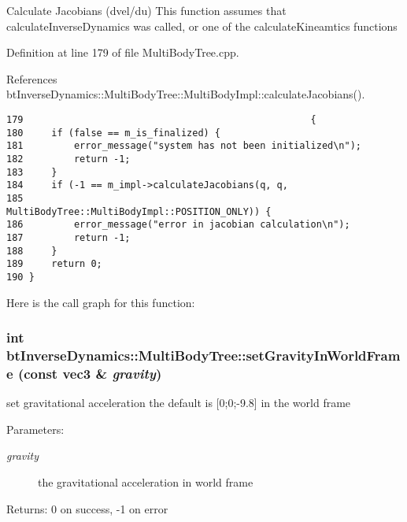 Calculate Jacobians (dvel/du) This function assumes that calculateInverseDynamics was called, or one of the calculateKineamtics functions 

Definition at line 179 of file MultiBodyTree.cpp.

References btInverseDynamics::MultiBodyTree::MultiBodyImpl::calculateJacobians().

\begin{Code}\begin{verbatim}179                                                   {
180     if (false == m_is_finalized) {
181         error_message("system has not been initialized\n");
182         return -1;
183     }
184     if (-1 == m_impl->calculateJacobians(q, q,
185                                          MultiBodyTree::MultiBodyImpl::POSITION_ONLY)) {
186         error_message("error in jacobian calculation\n");
187         return -1;
188     }
189     return 0;
190 }
\end{verbatim}
\end{Code}




Here is the call graph for this function:\hypertarget{classbt_inverse_dynamics_1_1_multi_body_tree_103b593ab2c8759489fbf6673f664288}{
\subsubsection[setGravityInWorldFrame]{\setlength{\rightskip}{0pt plus 5cm}int btInverseDynamics::MultiBodyTree::setGravityInWorldFrame (const {\bf vec3} \& {\em gravity})}}
\label{classbt_inverse_dynamics_1_1_multi_body_tree_103b593ab2c8759489fbf6673f664288}


set gravitational acceleration the default is \mbox{[}0;0;-9.8\mbox{]} in the world frame \begin{Desc}
\item[Parameters:]
\begin{description}
\item[{\em gravity}]the gravitational acceleration in world frame \end{description}
\end{Desc}
\begin{Desc}
\item[Returns:]0 on success, -1 on error \end{Desc}


